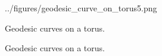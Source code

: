 \documentclass[main.tex]{subfiles}
\begin{document}
\begin{figure}[H]
{	{../figures/geodesic_curve_on_torus5.png}}
\caption[Geodesic curves on a torus.]{Geodesic curves on a torus.}
\end{figure}

\begin{figure}[H]
\hspace{-20mm}
\caption[Geodesic curves on a torus.]{Geodesic curves on a torus.}
\end{figure}
\end{document}

